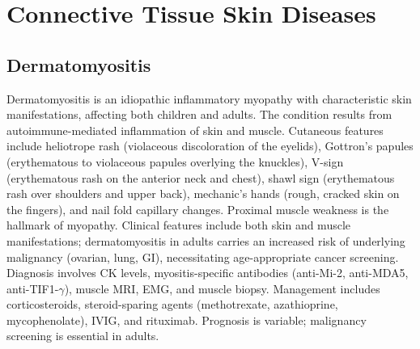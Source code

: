 \section{Connective Tissue Skin Diseases}








\label{sec:Connective Tissue Skin Diseases}

\subsection{Dermatomyositis}
\label{sec:skin:Dermatomyositis}
Dermatomyositis is an idiopathic inflammatory myopathy with characteristic skin manifestations, affecting both children and adults. The condition results from autoimmune-mediated inflammation of skin and muscle. Cutaneous features include heliotrope rash (violaceous discoloration of the eyelids), Gottron's papules (erythematous to violaceous papules overlying the knuckles), V-sign (erythematous rash on the anterior neck and chest), shawl sign (erythematous rash over shoulders and upper back), mechanic's hands (rough, cracked skin on the fingers), and nail fold capillary changes. Proximal muscle weakness is the hallmark of myopathy. Clinical features include both skin and muscle manifestations; dermatomyositis in adults carries an increased risk of underlying malignancy (ovarian, lung, GI), necessitating age-appropriate cancer screening. Diagnosis involves CK levels, myositis-specific antibodies (anti-Mi-2, anti-MDA5, anti-TIF1-$\gamma$), muscle MRI, EMG, and muscle biopsy. Management includes corticosteroids, steroid-sparing agents (methotrexate, azathioprine, mycophenolate), IVIG, and rituximab. Prognosis is variable; malignancy screening is essential in adults.

